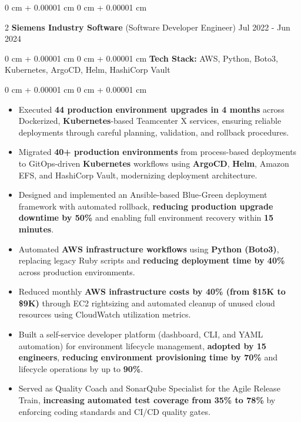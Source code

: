 \documentclass[9pt, letterpaper]{article}
\newenvironment{highlights}{
    \begin{itemize}[
        topsep=0.05 cm,
        parsep=0 pt,
        partopsep=0pt,
        itemsep=0pt,
        leftmargin=10pt
    ]
}{
    \end{itemize}
} %
\newenvironment{onecolentry}{
    \begin{adjustwidth}{
        0 cm + 0.00001 cm}{
        0 cm + 0.00001 cm}
}{
    \end{adjustwidth}
} %
\newenvironment{twocolentry}[2][]{
    \onecolentry
    \def\secondColumn{#2}
    \setcolumnwidth{\fill, 4.5 cm}
    \begin{paracol}{2}
}{
    \switchcolumn \raggedleft \secondColumn
    \end{paracol}
    \endonecolentry
} %
\begin{document}
    \begin{twocolentry}{Jul 2022 - Jun 2024}\textbf{Siemens Industry Software} (Software Developer Engineer)\end{twocolentry}
    \begin{onecolentry}\textbf{Tech Stack:} AWS, Python, Boto3, Kubernetes, ArgoCD, Helm, HashiCorp Vault \end{onecolentry}
    \begin{onecolentry}
        \begin{highlights}
            \item Executed \textbf{44 production environment upgrades in 4 months} across Dockerized, \textbf{Kubernetes}-based Teamcenter X services, ensuring reliable deployments through careful planning, validation, and rollback procedures.
            \item Migrated \textbf{40+ production environments} from process-based deployments to GitOps-driven \textbf{Kubernetes} workflows using \textbf{ArgoCD}, \textbf{Helm}, Amazon EFS, and HashiCorp Vault, modernizing deployment architecture.
            \item Designed and implemented an Ansible-based Blue-Green deployment framework with automated rollback, \textbf{reducing production upgrade downtime by 50\%} and enabling full environment recovery within \textbf{15 minutes}.
            \item Automated \textbf{AWS infrastructure workflows} using \textbf{Python (Boto3)}, replacing legacy Ruby scripts and \textbf{reducing deployment time by 40\%} across production environments.
            \item Reduced monthly \textbf{AWS infrastructure costs by 40\% (from \$15K to \$9K)} through EC2 rightsizing and automated cleanup of unused cloud resources using CloudWatch utilization metrics.
            \item Built a self-service developer platform (dashboard, CLI, and YAML automation) for environment lifecycle management, \textbf{adopted by 15 engineers}, \textbf{reducing environment provisioning time by 70\%} and lifecycle operations by up to \textbf{90\%}.
            \item Served as Quality Coach and SonarQube Specialist for the Agile Release Train, \textbf{increasing automated test coverage from 35\% to 78\%} by enforcing coding standards and CI/CD quality gates.
        \end{highlights}
    \end{onecolentry}
    \vspace{0.04 cm}
\end{document}
